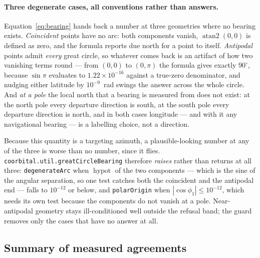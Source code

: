 \documentclass[11pt]{article}
\newcommand{\code}[1]{\texttt{#1}}
\begin{document}
\paragraph{Three degenerate cases, all conventions rather than answers.}
Equation~\eqref{eq:bearing} hands back a number at three geometries where no
bearing exists. \emph{Coincident} points have no arc: both components vanish,
$\operatorname{atan2}(0,0)$ is defined as zero, and the formula reports due
north for a point to itself. \emph{Antipodal} points admit \emph{every} great
circle, so whatever comes back is an artifact of how two vanishing terms round
--- from $(0,0)$ to $(0,\pi)$ the formula gives exactly $90^{\circ}$, because
$\sin\pi$ evaluates to $1.22\times10^{-16}$ against a true-zero denominator,
and nudging either latitude by $10^{-9}$~rad swings the answer across the whole
circle. And \emph{at a pole} the local north that a bearing is measured from
does not exist: at the north pole every departure direction is south, at the
south pole every departure direction is north, and in both cases longitude ---
and with it any navigational bearing --- is a labelling choice, not a
direction.

Because this quantity is a targeting azimuth, a plausible-looking number at any
of the three is worse than no number, since it flies.
\code{coorbital.util.greatCircleBearing} therefore \emph{raises} rather than
returns at all three: \code{degenerateArc} when
$\operatorname{hypot}$ of the two components --- which is the sine of the
angular separation, so one test catches both the coincident and the antipodal
end --- falls to $10^{-12}$ or below, and \code{polarOrigin} when
$|\cos\phi_1|\le 10^{-12}$, which needs its own test because the components do
not vanish at a pole. Near-antipodal geometry stays ill-conditioned well
outside the refusal band; the guard removes only the cases that have no answer
at all.

\subsection{Summary of measured agreements}
\end{document}
